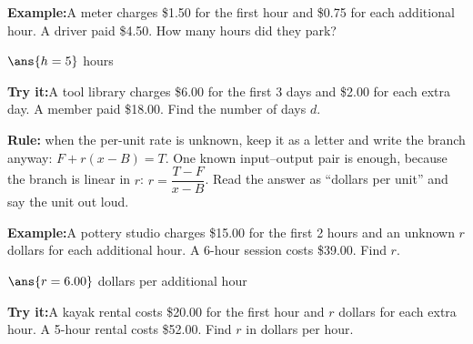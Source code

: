 \documentclass[12pt]{article}
\begin{document}
\begin{examplebox}
\textbf{Example:}\quad A meter charges \$1.50 for the first hour and \$0.75 for
each additional hour. A driver paid \$4.50. How many hours did they park?

$\ans{h = 5}$ hours
\end{examplebox}

\begin{tryitbox}
\textbf{Try it:}\quad A tool library charges \$6.00 for the first 3 days and
\$2.00 for each extra day. A member paid \$18.00. Find the number of days
$d$.\\[2pt]
\end{tryitbox}


\begin{formulabox}
\textbf{Rule:} when the per-unit rate is unknown, keep it as a letter and write
the branch anyway: $F + r(x - B) = T$. One known input--output pair is enough,
because the branch is linear in $r$: $r = \dfrac{T - F}{x - B}$. Read the
answer as ``dollars per unit'' and say the unit out loud.
\end{formulabox}

\begin{examplebox}
\textbf{Example:}\quad A pottery studio charges \$15.00 for the first 2 hours
and an unknown $r$ dollars for each additional hour. A 6-hour session costs
\$39.00. Find $r$.

$\ans{r = 6.00}$ dollars per additional hour
\end{examplebox}

\begin{tryitbox}
\textbf{Try it:}\quad A kayak rental costs \$20.00 for the first hour and $r$
dollars for each extra hour. A 5-hour rental costs \$52.00. Find $r$ in dollars
per hour.\\[2pt]
\end{tryitbox}
\end{document}

